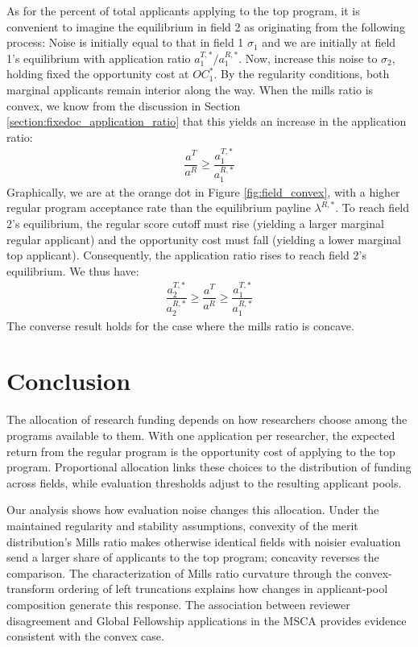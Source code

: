 \documentclass[12pt,reqno]{amsart}
\theoremstyle{definition}
\theoremstyle{plain} %
\begin{document}
\noindent As for the percent of total applicants applying to the top program, it is convenient to imagine the equilibrium in field 2 as originating from the following process: Noise is initially equal to that in field 1 $\sigma_1$ and we are initially at field 1's equilibrium with application ratio $a_1^{T,*}/a_1^{R,*}$. Now, increase this noise to $\sigma_2$, holding fixed the opportunity cost at $OC_1^*$. By the regularity conditions, both marginal applicants remain interior along the way. When the mills ratio is convex, we know from the discussion in Section \ref{section:fixedoc_application_ratio} that this yields an increase in the application ratio:
\begin{align*}
  \dfrac{a^T}{a^R} \geq \dfrac{a_1^{T,*}}{a_1^{R,*}}
\end{align*}
Graphically, we are at the orange dot in Figure \ref{fig:field_convex}, with a higher regular program acceptance rate than the equilibrium payline $\lambda^{R,*}$. To reach field 2's equilibrium, the regular score cutoff must rise (yielding a larger marginal regular applicant) and the opportunity cost must fall (yielding a lower marginal top applicant). Consequently, the application ratio rises to reach field 2's equilibrium. We thus have:
\begin{align*}
  \dfrac{a^{T,*}_2}{a^{R,*}_2} \geq \dfrac{a^T}{a^R} \geq \dfrac{a_1^{T,*}}{a_1^{R,*}}
\end{align*}
The converse result holds for the case where the mills ratio is concave. 

\newpage
\section{Conclusion}

The allocation of research funding depends on how researchers choose among the programs available to them. With one application per researcher, the expected return from the regular program is the opportunity cost of applying to the top program. Proportional allocation links these choices to the distribution of funding across fields, while evaluation thresholds adjust to the resulting applicant pools.

Our analysis shows how evaluation noise changes this allocation. Under the maintained regularity and stability assumptions, convexity of the merit distribution’s Mills ratio makes otherwise identical fields with noisier evaluation send a larger share of applicants to the top program; concavity reverses the comparison. The characterization of Mills ratio curvature through the convex-transform ordering of left truncations explains how changes in applicant-pool composition generate this response. The association between reviewer disagreement and Global Fellowship applications in the MSCA provides evidence consistent with the convex case.
\end{document}

